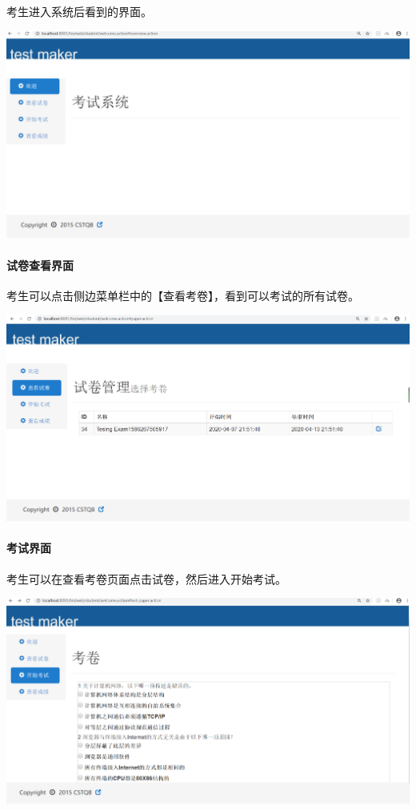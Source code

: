 \documentclass[hyperref, a4paper]{ctexart}
\let\oldparagraph\paragraph
\renewcommand{\paragraph}[1]{\oldparagraph{#1}\mbox{}}
\begin{document}
考生进入系统后看到的界面。

\includegraphics{pics/student_papers.jpeg}

\hypertarget{ux8bd5ux5377ux67e5ux770bux754cux9762}{%
\paragraph{试卷查看界面}\label{ux8bd5ux5377ux67e5ux770bux754cux9762}}

考生可以点击侧边菜单栏中的【查看考卷】，看到可以考试的所有试卷。

\includegraphics{pics/student_papers_show.jpeg}

\hypertarget{ux8003ux8bd5ux754cux9762}{%
\paragraph{考试界面}\label{ux8003ux8bd5ux754cux9762}}

考生可以在查看考卷页面点击试卷，然后进入开始考试。

\includegraphics{pics/student_test_papers.jpeg}
\end{document}
